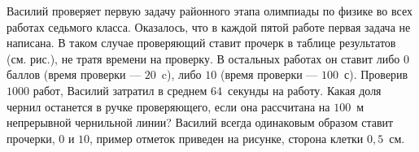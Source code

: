 	Василий проверяет первую задачу районного этапа олимпиады по физике во всех работах седьмого класса. Оказалось, что в каждой пятой работе первая задача не написана. В таком случае проверяющий ставит прочерк в таблице результатов (см. рис.), не тратя времени на проверку. В остальных работах он ставит либо $0$ баллов (время проверки --- $20$~c), либо $10$ (время проверки --- $100$~с). Проверив $1000$ работ, Василий затратил в среднем $64$~секунды на работу. Какая доля чернил останется в ручке проверяющего, если она рассчитана на $100$~м непрерывной чернильной линии? Василий всегда одинаковым образом ставит прочерки, $0$ и $10$, пример отметок приведен на рисунке, сторона клетки $0{,}5$~см.